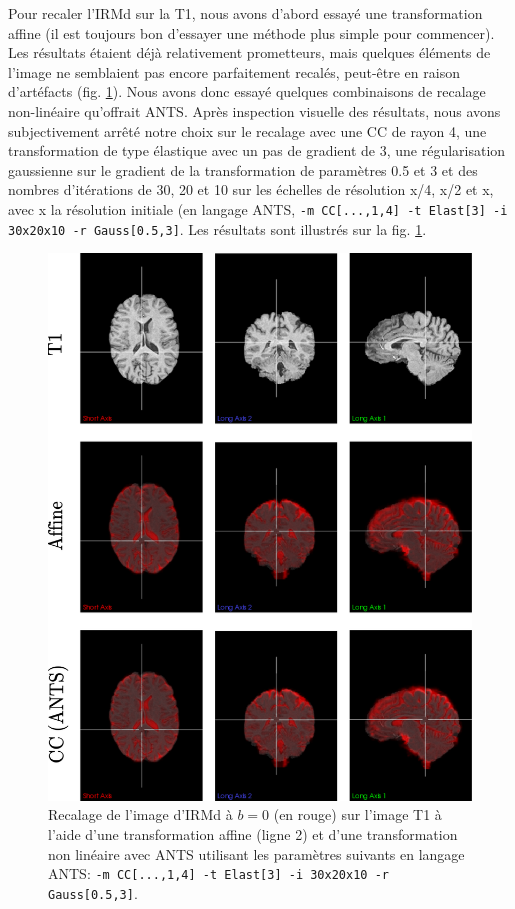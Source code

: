 \documentclass[a4paper]{article}
\begin{document}
Pour recaler l'IRMd sur la T1, nous avons d'abord essayé une transformation affine (il est toujours bon d'essayer une méthode plus simple pour commencer). Les résultats étaient déjà relativement prometteurs, mais quelques éléments de l'image ne semblaient pas encore parfaitement recalés, peut-être en raison d'artéfacts (fig. \ref{b0-to-t1}). Nous avons donc essayé quelques combinaisons de recalage non-linéaire qu'offrait ANTS. Après inspection visuelle des résultats, nous avons subjectivement arrêté notre choix sur le recalage avec une CC de rayon 4, une transformation de type élastique avec un pas de gradient de 3, une régularisation gaussienne sur le gradient de la transformation de paramètres 0.5 et 3 et des nombres d'itérations de 30, 20 et 10 sur les échelles de résolution x/4, x/2 et x, avec x la résolution initiale (en langage ANTS, \lstinline{-m CC[...,1,4] -t Elast[3] -i 30x20x10 -r Gauss[0.5,3]}. Les résultats sont illustrés sur la fig. \ref{b0-to-t1}.
\begin{figure}
\begin{center}
\includegraphics[scale=0.5]{b0-to-t1}
\caption{Recalage de l'image d'IRMd à $b=0$ (en rouge) sur l'image T1 à l'aide d'une transformation affine (ligne 2) et d'une transformation non linéaire avec ANTS utilisant les paramètres suivants en langage ANTS: \lstinline{-m CC[...,1,4] -t Elast[3] -i 30x20x10 -r Gauss[0.5,3]}. \label{b0-to-t1}}
\end{center}
\end{figure}  
\end{document}
